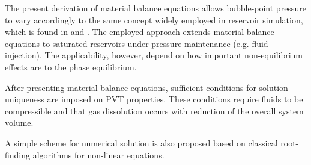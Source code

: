 \documentclass[authoryear,preprint,review,12pt]{elsarticle}
\begin{document}


The present derivation of material balance equations allows bubble-point pressure to vary accordingly to the same concept widely employed in reservoir simulation, which is found in \cite{aziz1979petroleum} and \cite{ertekin2001basic}. The employed approach extends material balance equations to saturated reservoirs under pressure maintenance (e.g. fluid injection). The applicability, however, depend on how important non-equilibrium effects are to the phase equilibrium.


After presenting material balance equations, sufficient conditions for solution uniqueness are imposed on PVT properties. These conditions require fluids to be compressible and that gas dissolution occurs with reduction of the overall system volume.

A simple scheme for numerical solution is also proposed based on classical root-finding algorithms for non-linear equations.
\end{document}
